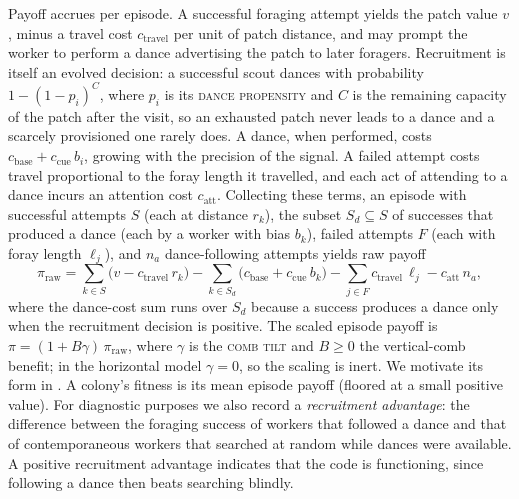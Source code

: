 \documentclass[11pt]{article}
\newcommand{\trait}[1]{\textsc{#1}}
\begin{document}
Payoff accrues per episode. A successful foraging attempt yields the patch value $v$, minus
a travel cost $c_{\mathrm{travel}}$ per unit of patch distance, and may prompt the worker to
perform a dance advertising the patch to later foragers. Recruitment is itself an
evolved decision: a successful scout dances with probability $1 - (1 - p_i)^{C}$,
where $p_i$ is its \trait{dance propensity} and $C$ is the remaining capacity of the patch
after the visit, so an exhausted patch never leads to a dance and a scarcely
provisioned one rarely does. A dance, when performed, costs
$c_{\mathrm{base}} + c_{\mathrm{cue}}\,b_i$, growing with the precision of the
signal. A failed attempt costs travel proportional to the foray length it
travelled, and each act of attending to a dance incurs an attention cost $c_{\mathrm{att}}$.
Collecting these terms, an episode with successful attempts $S$ (each at distance
$r_k$), the subset $S_d \subseteq S$ of successes that produced a dance (each by a
worker with bias $b_k$), failed attempts $F$ (each with foray length $\ell_j$),
and $n_a$ dance-following attempts yields raw payoff
\begin{equation}
  \pi_{\mathrm{raw}} = \sum_{k \in S}\bigl(v - c_{\mathrm{travel}}\,r_k\bigr)
    - \sum_{k \in S_d}\bigl(c_{\mathrm{base}} + c_{\mathrm{cue}}\,b_k\bigr)
    - \sum_{j \in F} c_{\mathrm{travel}}\,\ell_j
    - c_{\mathrm{att}}\,n_a,
\end{equation}
where the dance-cost sum runs over $S_d$ because a success produces a dance only
when the recruitment decision is positive.
The scaled episode payoff is $\pi = (1 + B\gamma)\,\pi_{\mathrm{raw}}$, where
$\gamma$ is the \trait{comb tilt} and $B \ge 0$ the vertical-comb benefit; in the
horizontal model $\gamma = 0$, so the scaling is inert. We motivate its form in
. A colony's fitness is its mean episode payoff (floored at a
small positive value).
For diagnostic purposes we also record a \emph{recruitment advantage}: the
difference between the foraging success of workers that followed a dance and that
of contemporaneous workers that searched at random while dances were available. A
positive recruitment advantage indicates that the code is functioning, since
following a dance then beats searching blindly.
\end{document}
